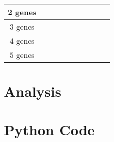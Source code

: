 \documentclass[10pt]{article}
\begin{document}
\begin{table}[ht]
\begin{tabular}{|c|c|c|c|c|c|c|c|c|c|}
2 genes           &                                                        &                                                        &                                                        &                                                        &                                                       &                                                       &                                                        &                                                       &                                                       \\ \hline
3 genes           &                                                        &                                                        &                                                        &                                                        &                                                       &                                                       &                                                        &                                                       &                                                       \\ \hline
4 genes           &                                                        &                                                        &                                                        &                                                        &                                                       &                                                       &                                                        &                                                       &                                                       \\ \hline
5 genes           &                                                        &                                                        &                                                        &                                                        &                                                       &                                                       &                                                        &                                                       &                                                       \\ \hline
\end{tabular}
\end{table}

\section{Analysis}
		
\section{Python Code}

	
\end{document}
